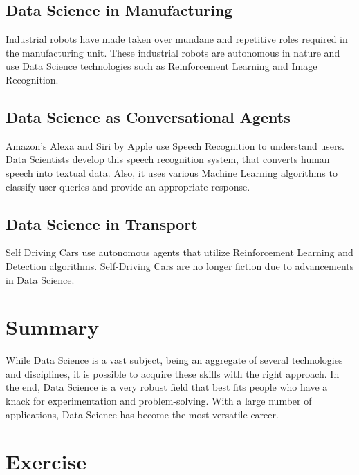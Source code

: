 \documentclass[
]{book}
\begin{document}
\hypertarget{data-science-in-manufacturing}{%
\subsection*{Data Science in Manufacturing}\label{data-science-in-manufacturing}}


Industrial robots have made taken over mundane and repetitive roles required in the manufacturing unit. These industrial robots are autonomous in nature and use Data Science technologies such as Reinforcement Learning and Image Recognition.

\hypertarget{data-science-as-conversational-agents}{%
\subsection*{Data Science as Conversational Agents}\label{data-science-as-conversational-agents}}


Amazon's Alexa and Siri by Apple use Speech Recognition to understand users. Data Scientists develop this speech recognition system, that converts human speech into textual data. Also, it uses various Machine Learning algorithms to classify user queries and provide an appropriate response.

\hypertarget{data-science-in-transport}{%
\subsection*{Data Science in Transport}\label{data-science-in-transport}}


Self Driving Cars use autonomous agents that utilize Reinforcement Learning and Detection algorithms. Self-Driving Cars are no longer fiction due to advancements in Data Science.

\hypertarget{summary}{%
\section*{Summary}\label{summary}}


While Data Science is a vast subject, being an aggregate of several technologies and disciplines, it is possible to acquire these skills with the right approach. In the end, Data Science is a very robust field that best fits people who have a knack for experimentation and problem-solving. With a large number of applications, Data Science has become the most versatile career.

\hypertarget{exercise}{%
\section*{Exercise}\label{exercise}}
\end{document}
